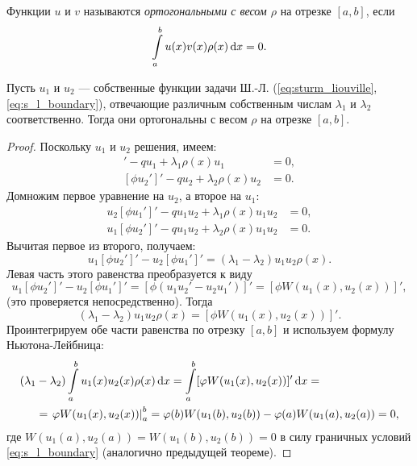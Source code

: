\begin{definition}
    Функции $u$ и $v$ называются \emph{ортогональными с весом $\rho$} на отрезке $[a, b]$, если
    \[ \int\limits_{a}^{b} u(x) v(x) \rho(x) \,\mathrm{d}{x} = 0. \]
\end{definition}

\begin{theorem}
    Пусть $u_1$ и $u_2$ --- собственные функции задачи Ш.-Л. (\ref{eq:sturm_liouville}, \ref{eq:s_l_boundary}), отвечающие различным собственным числам $\lambda_1$ и $\lambda_2$ соответственно. Тогда они ортогональны с весом $\rho$ на отрезке $[a, b]$.
\end{theorem}

\begin{proof}
    Поскольку $u_1$ и $u_2$ решения, имеем:
    \begin{align*}
        [\phi u_1']' - q u_1 + \lambda_1 \rho(x) u_1 &= 0, \\
        [\phi u_2']' - q u_2 + \lambda_2 \rho(x) u_2 &= 0.
    \end{align*}
    Домножим первое уравнение на $u_2$, а второе на $u_1$:
    \begin{align*}
        u_2 [\phi u_1']' - q u_1 u_2 + \lambda_1 \rho(x) u_1 u_2 &= 0, \\
        u_1 [\phi u_2']' - q u_1 u_2 + \lambda_2 \rho(x) u_1 u_2 &= 0.
    \end{align*}
    Вычитая первое из второго, получаем:
    \[ u_1 [\phi u_2']' - u_2 [\phi u_1']' = (\lambda_1 - \lambda_2) u_1 u_2 \rho(x). \]
    Левая часть этого равенства преобразуется к виду
    \[ u_1 [\phi u_2']' - u_2 [\phi u_1']' = [\phi (u_1 u_2' - u_2 u_1')]' = [\phi W(u_1(x), u_2(x))]', \]
    (это проверяется непосредственно). Тогда
    \[ (\lambda_1 - \lambda_2) u_1 u_2 \rho(x) = [\phi W(u_1(x), u_2(x))]'. \]
    Проинтегрируем обе части равенства по отрезку $[a, b]$ и используем формулу Ньютона-Лейбница:
    \begin{align*}
        (\lambda_1 &- \lambda_2) \int\limits_{a}^{b} u_1(x) u_2(x) \rho(x) \,\mathrm{d}{x} =
        \int\limits_{a}^{b} [\varphi W(u_1(x), u_2(x))]' \,\mathrm{d}{x} = \\ &=
        \left. \varphi W(u_1(x), u_2(x)) \right|_{a}^{b} = \varphi(b) W(u_1(b), u_2(b)) -
        \varphi(a) W(u_1(a), u_2(a)) = 0,
    \end{align*}
    где $W(u_1(a), u_2(a)) = W(u_1(b), u_2(b)) = 0$ в силу граничных условий \eqref{eq:s_l_boundary} (аналогично предыдущей теореме).
\end{proof}
